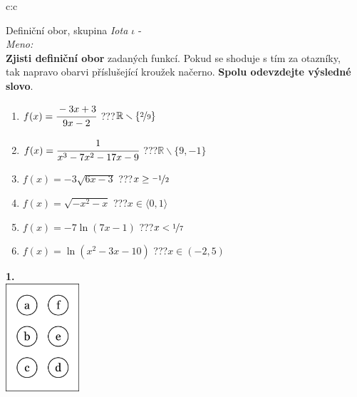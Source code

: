 \documentclass[10pt]{report}
\begin{document}
\begin{tabular}{c:c}
\begin{minipage}[c][99mm][t]{0.49\linewidth}
\begin{center}
\vspace{7mm}
{\huge Definiční obor, skupina \textit{Iota $\iota$} -}\\[4.5mm]
\textit{Meno:}\phantom{xxxxxxxxxxxxxxxxxxxxxxxxxxxxxxxxxxxxxxxxxxxxxxxxxxxxxxxxxxxxxxxxx}\\[3.5mm]
\textbf{Zjisti definiční obor} zadaných funkcí. Pokud se shoduje s tím za otazníky,\\tak napravo obarvi příslušející kroužek načerno. \textbf{Spolu odevzdejte výsledné slovo}.\\[3mm]
\begin{minipage}{0.77\linewidth}
\begin{center}
\begin{varwidth}{\textwidth}
\begin{enumerate}
\normalsize
\item $f(x)=\cfrac{-3x+3}{9x-2}$\quad \dotfill\; ???\;\dotfill \quad $\mathbb{R}\smallsetminus\{\nicefrac{2}{9}\}$
\item $f(x)=\cfrac{1}{x^3-7x^2-17x-9}$\quad \dotfill\; ???\;\dotfill \quad $\mathbb{R}\smallsetminus\{9,-1\}$
\item $f(x)=-3\sqrt{6x-3}$\quad \dotfill\; ???\;\dotfill \quad $x\geq\nicefrac{-1}{2}$
\item $f(x)=\sqrt{-x^2-x}$\quad \dotfill\; ???\;\dotfill \quad $x\in\langle0 , 1\rangle$
\item $f(x)=-7\ln{(7x-1)}$\quad \dotfill\; ???\;\dotfill \quad $x<\nicefrac{1}{7}$
\item $f(x)=\ln{(x^2-3x-10)}$\quad \dotfill\; ???\;\dotfill \quad $x\in(-2 , 5)$
\end{enumerate}
\end{varwidth}
\end{center}
\end{minipage}
\begin{minipage}{0.20\linewidth}
\begin{center}
{\Huge\bfseries 1.} \\[2mm]
\includegraphics[height=40mm]{../images/braille.png}

\end{center}
\end{minipage}
\end{center}
\end{minipage}
\end{tabular}
\end{document}
